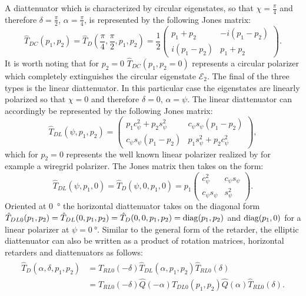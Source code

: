 A diattenuator which is characterized by circular eigenstates, so that $\chi=\frac{\pi}{4}$ and therefore $\delta=\frac{\pi}{2}$, $\alpha=\frac{\pi}{4}$, is represented by the following Jones matrix:
\begin{equation}
    \hat{T}_{DC}(p_1, p_2) = \hat{T}_D\left(\frac{\pi}{4}, \frac{\pi}{2}, p_1, p_2\right) =
    \frac{1}{2}
    \begin{pmatrix} 
    p_1 + p_2 & -i(p_1 - p_2) \\
    i(p_1 - p_2) & p_1 + p_2
    \end{pmatrix}.
\end{equation}
It is worth noting that for $p_2=0$ $\hat{T}_{DC}(p_1, p_2=0)$ represents a circular polarizer which completely extinguishes the circular eigenstate $\bm{\mathcal{E}}_2$. The final of the three types is the linear diattenuator. In this particular case the eigenstates are linearly polarized so that $\chi=0$ and therefore $\delta=0$, $\alpha=\psi$. The linear diattenuator can accordingly be represented by the following Jones matrix:
\begin{equation}
    \hat{T}_{DL}(\psi, p_1, p_2) = 
    \begin{pmatrix} 
    p_1c_{\psi}^2 + p_2s_{\psi}^2 & c_{\psi}s_{\psi}(p_1 - p_2) \\
    c_{\psi}s_{\psi}(p_1 - p_2) & p_1s_{\psi}^2 + p_2c_{\psi}^2
    \end{pmatrix},
\end{equation}
which for $p_2=0$ represents the well known linear polarizer realized by for example a wiregrid polarizer. The Jones matrix then takes on the form:
\begin{equation}
    \hat{T}_{DL}(\psi, p_1, 0) = \hat{T}_{D}(\psi, 0, p_1, 0) =
    p_1
    \begin{pmatrix} 
    c_{\psi}^2 & c_{\psi}s_{\psi} \\
    c_{\psi}s_{\psi} & s_{\psi}^2
    \end{pmatrix}.
\end{equation}
Oriented at \SI{0}{\degree} the horizontal diattenuator takes on the diagonal form $\hat{T}_{DL0}(p_1, p_2) = \hat{T}_{DL}(0, p_1, p_2)=\hat{T}_{D}(0,0,p_1,p_2)=\operatorname{diag}(p_1, p_2)$ and $\operatorname{diag}(p_1, 0)$ for a linear polarizer at $\psi = \SI{0}{\degree}$. Similar to the general form of the retarder, the elliptic diattenuator can also be written as a product of rotation matrices, horizontal retarders and diattenuators as follows:
\begin{align}
\begin{split}
    \hat{T}_{D}(\alpha, \delta, p_1, p_2) 
    &= \hat{T}_{RL0}(-\delta)\hat{T}_{DL}(\alpha, p_1, p_2)\hat{T}_{RL0}(\delta) \\
    &= \hat{T}_{RL0}(-\delta)\hat{Q}(-\alpha)\hat{T}_{DL0}(p_1, p_2)\hat{Q}(\alpha)\hat{T}_{RL0}(\delta).
\end{split}
\end{align}
